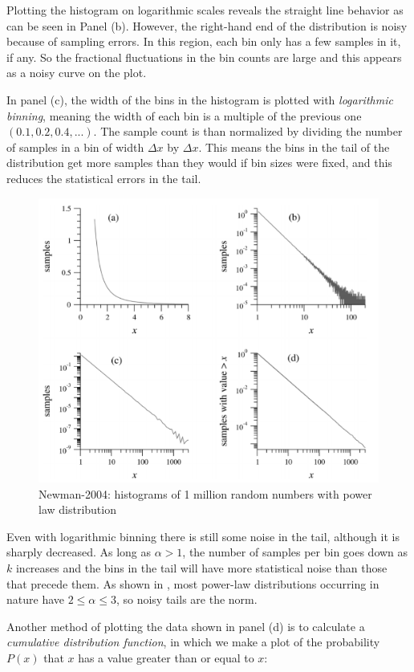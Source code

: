 \documentclass[a4paper, 12pt]{report}
\begin{document}
Plotting the histogram on logarithmic scales reveals the straight line behavior as can be seen in Panel (b). However, the right-hand end of the distribution is noisy because of sampling errors. In this region, each bin only has a few samples in it, if any. So the fractional fluctuations in the bin counts are large and this appears as a noisy curve on the plot.

In panel (c), the width of the bins in the histogram is plotted with \textit{logarithmic binning}, meaning the width of each bin is a multiple of the previous one $(0.1,0.2,0.4,...)$. The sample count is than normalized by dividing the number of samples in a bin of width $\Delta x$ by $\Delta x$. This means the bins in the tail of the distribution get more samples than they would if bin sizes were fixed, and this reduces the statistical errors in the tail.

\begin{figure}[!htb]
\centering
\includegraphics[width=0.7\linewidth]{./histogram-1-million}
\caption[Newman-2004: histograms of 1 million random numbers]{Newman-2004: histograms of 1 million random numbers with power law distribution}
\label{fig:histogram-1-million}
\end{figure}

Even with logarithmic binning there is still some noise in the tail, although it is sharply decreased. As long as $\alpha > 1$, the number of samples per bin goes down as $k$ increases and the bins in the tail will have more statistical noise than those that precede them. As shown in \cite{newman}, most power-law distributions occurring in nature have $2 \leq \alpha \leq 3$, so noisy tails are the norm.

Another method of plotting the data shown in panel (d) is to calculate a \textit{cumulative distribution function}, in which we make a plot of the probability $P(x)$ that $x$ has a value greater than or equal to $x$:
\end{document}
